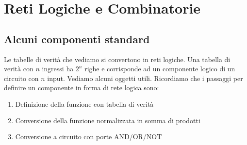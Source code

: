 \chapter{Reti Logiche e Combinatorie}

\section{Alcuni componenti standard}

Le tabelle di verità che vediamo si convertono in reti logiche. Una tabella di
verità con $ n $ ingressi ha $ 2^n $ righe e corrisponde ad un componente logico
di un circuito con $ n $ input. Vediamo alcuni oggetti utili. Ricordiamo che i
passaggi per definire un componente in forma di rete logica sono:

\begin{enumerate}
	\item Definizione della funzione con tabella di verità
	\item Conversione della funzione normalizzata in somma di prodotti
	\item Conversione a circuito con porte AND/OR/NOT
\end{enumerate}


